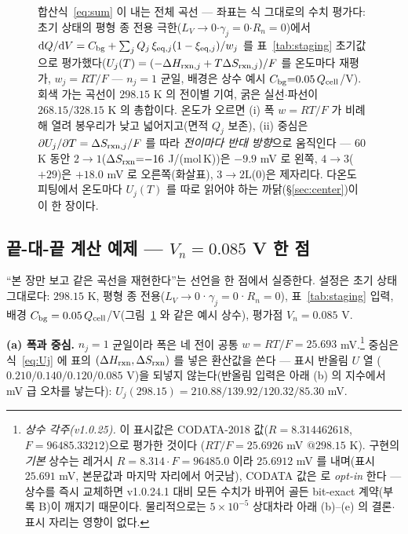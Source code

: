 \begin{figure}[t]
\caption{합산식~\eqref{eq:sum} 이 내는 전체 곡선 --- 좌표는 식 그대로의 수치 평가다: 초기 상태의 평형
종 전용 극한($L_V\!\to\!0$$\cdot$$\gamma_j{=}0$$\cdot$$R_n{=}0$)에서
$\mathrm{d} Q/\mathrm{d} V=C_{\mathrm{bg}}+\sum_jQ_j\,\xi_{\mathrm{eq},j}(1-\xi_{\mathrm{eq},j})/w_j$ 를 표~\ref{tab:staging} 초기값으로
평가했다($U_j(T)=(-\Delta H_{\mathrm{rxn},j}+T\Delta S_{\mathrm{rxn},j})/F$ 를 온도마다 재평가, $w_j{=}RT/F$
--- $n_j{=}1$ 균일, 배경은 상수 예시 $C_{\mathrm{bg}}{=}0.05\,Q_{\mathrm{cell}}$/V). 회색 가는 곡선이 $298.15$ K 의
전이별 기여, 굵은 실선$\cdot$파선이 $268.15/328.15$ K 의 총합이다. 온도가 오르면 (i) 폭
$w{=}RT/F$ 가 비례해 열려 봉우리가 낮고 넓어지고(면적 $Q_j$ 보존), (ii) 중심은
$\partial U_j/\partial T=\Delta S_{\mathrm{rxn},j}/F$ 를 따라 \emph{전이마다 반대 방향}으로 움직인다 ---
$60$ K 동안 $2\!\to\!1$($\Delta S_{\mathrm{rxn}}{=}{-}16$ J/(mol\,K))은 $-9.9$ mV 로 왼쪽,
$4\!\to\!3$($+29$)은 $+18.0$ mV 로 오른쪽(화살표), $3\!\to\!2\mathrm L$($0$)은 제자리다. 다온도
피팅에서 온도마다 $U_j(T)$ 를 따로 읽어야 하는 까닭(\S\ref{sec:center})이 이 한 장이다.}
\label{fig:sumcurve}
\end{figure}

\subsection{끝-대-끝 계산 예제 --- $V_n=0.085$ V 한 점}\label{sec:sum-worked}
``본 장만 보고 같은 곡선을 재현한다''는 선언을 한 점에서 실증한다. 설정은 초기 상태 그대로다:
$298.15$ K, 평형 종 전용($L_V\!\to\!0$·$\gamma_j{=}0$·$R_n{=}0$), 표~\ref{tab:staging} 입력,
배경 $C_{\mathrm{bg}}=0.05\,Q_{\mathrm{cell}}$/V(그림~\ref{fig:sumcurve} 와 같은 예시 상수), 평가점 $V_n=0.085$ V.

\textbf{(a) 폭과 중심.} $n_j{=}1$ 균일이라 폭은 네 전이 공통 $w=RT/F=25.693$ mV.\footnote{\emph{상수
각주(v1.0.25).} 이 표시값은 CODATA-2018 값($R{=}8.314462618$, $F{=}96485.33212$)으로 평가한 것이다
($RT/F=25.6926$ mV $@298.15$ K). 구현의 \emph{기본} 상수는 레거시 $R{=}8.314\cdot F{=}96485.0$ 이라
$25.6912$ mV 를 내며(표시 $25.691$ mV, 본문값과 마지막 자리에서 어긋남), CODATA 값은
 로 \emph{opt-in} 한다 --- 상수를 즉시 교체하면 v1.0.24.1 대비 모든 수치가 바뀌어
골든 bit-exact 계약(부록 B)이 깨지기 때문이다. 물리적으로는 $5\times10^{-5}$ 상대차라 아래 (b)--(e) 의
결론$\cdot$표시 자리는 영향이 없다.} 중심은
식~\eqref{eq:Uj} 에 표의 $(\Delta H_{\mathrm{rxn}},\Delta S_{\mathrm{rxn}})$ 를 넣은 환산값을 쓴다 --- 표시 반올림 $U$ 열
($0.210/0.140/0.120/0.085$ V)을 되넣지 않는다(반올림 입력은 아래 (b) 의 지수에서 mV 급 오차를 낳는다):
$U_j(298.15)=210.88/139.92/120.32/85.30$ mV.

